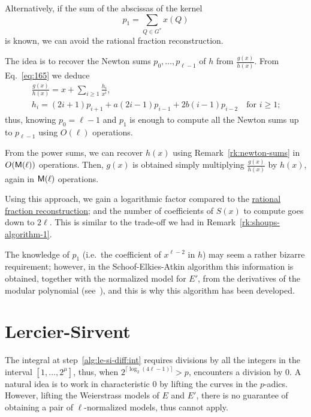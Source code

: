 \begin{remark}
  \label{rk:bmss}
  Alternatively, if the sum of the abscissas of the kernel
  \begin{equation}
    \label{eq:182}
    p_1 = \sum_{Q\in G^\ast}x(Q)
  \end{equation}
  is known, we can avoid the rational fraction reconstruction.

  The idea is to recover the Newton sums $p_0,\ldots,p_{\ell-1}$ of
  $h$ from $\frac{g(x)}{h(x)}$. From Eq.~\eqref{eq:165} we deduce
  \begin{equation}
    \label{eq:181}
    \begin{gathered}
      \frac{g(x)}{h(x)} = x + \sum_{i\ge1}\frac{h_i}{x^i}\text{,}\\
      h_i = (2i+1)p_{i+1} + a(2i-1)p_{i-1} + 2b(i-1)p_{i-2}
      \quad\text{for $i\ge1$;}
    \end{gathered}
  \end{equation}
  thus, knowing $p_0=\ell-1$ and $p_1$ is enough to compute all the
  Newton sums up to $p_{\ell-1}$ using $O(\ell)$ operations.

  From the power sums, we can recover $h(x)$ using
  Remark~\ref{rk:newton-sums} in $O(\mathsf{M}(\ell))$ operations. Then,
  $g(x)$ is obtained simply multiplying $\frac{g(x)}{h(x)}$ by $h(x)$,
  again in $\mathsf{M}(\ell)$ operations.

  Using this approach, we gain a logarithmic factor compared to the
  \hyperref[sec:eucl-algor-rati]{rational fraction reconstruction};
  and the number of coefficients of $S(x)$ to compute goes down to
  $2\ell$. This is similar to the trade-off we had in
  Remark~\ref{rk:shoups-algorithm-1}.

    The knowledge of $p_1$
  (i.e.\ the coefficient of $x^{\ell-2}$ in $h$) may seem a rather
  bizarre requirement; however, in the Schoof-Elkies-Atkin algorithm
  this information is obtained, together with the normalized model for
  $E'$, from the derivatives of the modular polynomial
  (see~\cite{elkies98,morain95}), and this is why this algorithm has
  been developed.
\end{remark}



\section{Lercier-Sirvent}
\label{sec:lercier-sirvent}
The integral at step~\ref{alg:le-si-diff:int} requires divisions by
all the integers in the interval $[1,\ldots,2^\mu]$, thus, when
$2^{\lceil\log_2(4\ell-1)\rceil}>p$, 
encounters a division by $0$. A natural idea is to work in
characteristic $0$ by lifting the curves in the $p$-adics. However,
lifting the Weierstrass models of $E$ and $E'$, there is no guarantee
of obtaining a pair of $\ell$-normalized models, thus
 cannot apply.


